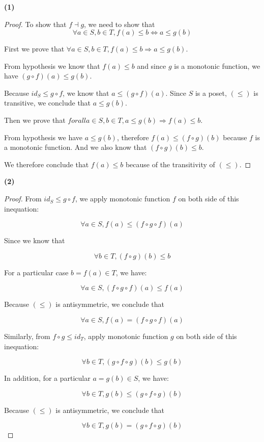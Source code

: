 \documentclass[11pt]{article}
\begin{document}
\subsubsection{}

\textbf{(1)}

\begin{proof}
To show that $f \dashv g$, we need to show that
\[
\forall a \in S, b \in T, f(a) \le b \Leftrightarrow a \le g(b)
\]

First we prove that $\forall a \in S, b \in T, f(a) \le b \Rightarrow a \le g(b)$.

From hypothesis we know that $f(a) \le b$ and since $g$ is a monotonic function,
we have $(g \circ f)(a) \le g(b)$.

Because $id_S \le g \circ f$, we know that $a \le (g \circ f)(a)$. Since $S$ is a poset,
$(\le)$ is transitive, we conclude that $a \le g(b)$.

Then we prove that $forall a \in S, b \in T, a \le g(b) \Rightarrow f(a) \le b$.

From hypothesis we have $a \le g(b)$, therefore $f(a) \le (f \circ g)(b)$
because $f$ is a monotonic function.
And we also know that $(f \circ g)(b) \le b$.

We therefore conclude that $f(a) \le b$ because of the transitivity of $(\le)$.

\end{proof}

\textbf{(2)}

\begin{proof}
From $id_S \le g \circ f$, we apply monotonic function $f$ on both side of this inequation:

\[
\forall a \in S, f(a) \le (f \circ g \circ f)(a)
\]

Since we know that

\[
\forall b \in T, (f \circ g)(b) \le b
\]

For a particular case $b = f(a) \in T$, we have:

\[
\forall a \in S, (f \circ g \circ f)(a) \le f(a)
\]

Because $(\le)$ is antisymmetric, we conclude that

\[
\forall a \in S, f(a) = (f \circ g \circ f)(a)
\]

Similarly, from $f \circ g \le id_T$, apply monotonic function $g$ on both side of this inequation:

\[
\forall b \in T, (g \circ f \circ g)(b) \le g(b)
\]

In addition, for a particular $a = g(b) \in S$, we have:

\[
\forall b \in T, g(b) \le (g \circ f \circ g)(b)
\]

Because $(\le)$ is antisymmetric, we conclude that

\[
\forall b \in T, g(b) = (g \circ f \circ g)(b)
\]

\end{proof}
\end{document}
